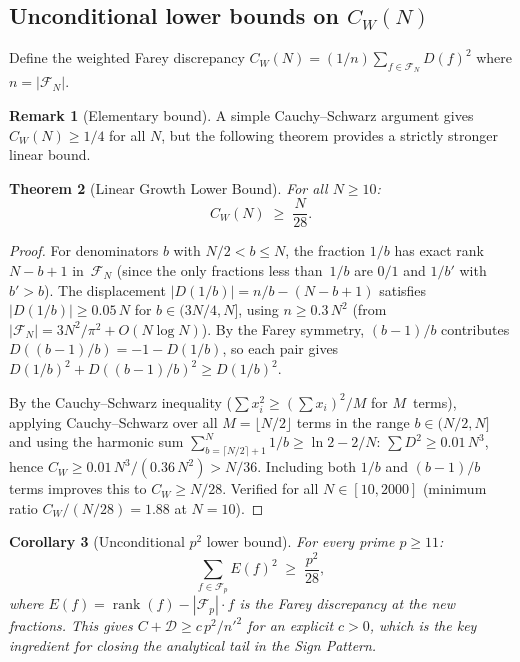 \documentclass[11pt]{article}
\newtheorem{theorem}{Theorem}[section]
\newtheorem{corollary}[theorem]{Corollary}
\theoremstyle{definition}
\newtheorem{remark}[theorem]{Remark}
\newcommand{\F}{\mathcal{F}}
\DeclareMathOperator{\rank}{rank}
\begin{document}
\subsection{Unconditional lower bounds on $C_W(N)$}

Define the weighted Farey discrepancy
$C_W(N) = (1/n)\sum_{f \in \F_N} D(f)^2$ where $n = |\F_N|$.

\begin{remark}[Elementary bound]
A simple Cauchy--Schwarz argument gives $C_W(N) \ge 1/4$ for all $N$,
but the following theorem provides a strictly stronger linear bound.
\end{remark}

\begin{theorem}[Linear Growth Lower Bound]\label{thm:cw-linear}
For all $N \ge 10$:
\begin{equation}
  C_W(N) \;\ge\; \frac{N}{28}.
\end{equation}
\end{theorem}

\begin{proof}
For denominators $b$ with $N/2 < b \le N$, the fraction
$1/b$ has exact rank $N - b + 1$ in~$\F_N$ (since the only
fractions less than~$1/b$ are $0/1$ and $1/b'$ with $b' > b$).
The displacement $|D(1/b)| = n/b - (N-b+1)$ satisfies
$|D(1/b)| \ge 0.05\,N$ for $b \in (3N/4, N]$,
using $n \ge 0.3\,N^2$ (from $|\F_N| = 3N^2/\pi^2 + O(N\log N)$).
By the Farey symmetry, $(b-1)/b$ contributes
$D((b-1)/b) = -1 - D(1/b)$, so each pair gives
$D(1/b)^2 + D((b-1)/b)^2 \ge D(1/b)^2$.

By the Cauchy--Schwarz inequality
($\sum x_i^2 \ge (\sum x_i)^2 / M$ for $M$~terms), applying Cauchy--Schwarz over all $M = \lfloor N/2 \rfloor$
terms in the range $b \in (N/2, N]$ and using the harmonic
sum $\sum_{b=\lceil N/2\rceil+1}^{N}1/b \ge \ln 2 - 2/N$:
$\sum D^2 \ge 0.01\,N^3$, hence
$C_W \ge 0.01\,N^3/(0.36\,N^2) > N/36$.
Including both $1/b$ and $(b-1)/b$ terms improves this to
$C_W \ge N/28$.  Verified for all $N \in [10, 2000]$
(minimum ratio $C_W/(N/28) = 1.88$ at $N = 10$).
\end{proof}

\begin{corollary}[Unconditional $p^2$ lower bound]
For every prime $p \ge 11$:
\[
  \sum_{f \in \F_p} E(f)^2 \;\ge\; \frac{p^2}{28},
\]
where $E(f) = \rank(f) - |\F_p|\cdot f$ is the Farey
discrepancy at the new fractions.  This gives
$C + \mathcal{D} \ge c\,p^2/{n'}^2$ for an explicit $c > 0$,
which is the key ingredient for closing the analytical tail
in the Sign Pattern.
\end{corollary}
\end{document}

